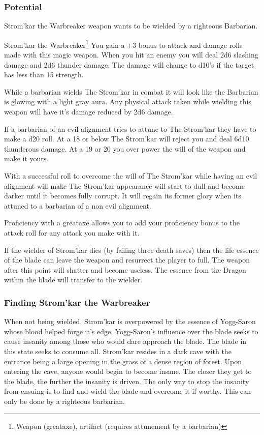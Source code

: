 \subsubsection{Potential}

Strom'kar the Warbreaker weapon wants to be wielded by a righteous Barbarian. 

\begin{commentbox}{Strom'kar the Warbreaker\footnote{Weapon (greataxe), artifact (requires attunement by a barbarian)}}	
	You gain a +3 bonus to attack and damage rolls made with this magic weapon. When you hit an enemy you will deal 2d6 slashing damage and 2d6 thunder damage. The damage will change to d10's if the target has less than 15 strength.
	
	While a barbarian wields The Strom'kar in combat it will look like the Barbarian is glowing with a light gray aura. Any physical attack taken while wielding this weapon will have it's damage reduced by 2d6 damage.
	
	If a barbarian of an evil alignment tries to attune to The Strom'kar they have to make a d20 roll. At a 18 or below The Strom'kar will reject you and deal 6d10 thunderous damage. At a 19 or 20 you over power the will of the weapon and make it yours.
	
	With a successful roll to overcome the will of The Strom'kar while having an evil alignment will make The Strom'kar appearance will start to dull and become darker until it becomes fully corrupt. It will regain its former glory when its attuned to a barbarian of a non evil alignment.
	
	Proficiency with a greataxe allows you to add your proficiency bonus to the attack roll for any attack you make with it.
	
	If the wielder of Strom'kar dies (by failing three death saves) then the life essence of the blade can leave the weapon and resurrect the player to full. The weapon after this point will shatter and become useless. The essence from the Dragon within the blade will transfer to the wielder.
\end{commentbox}

\subsubsection{Finding Strom'kar the Warbreaker}

When not being wielded, Strom'kar is overpowered by the essence of Yogg-Saron whose blood helped forge it's edge. Yogg-Saron's influence over the blade seeks to cause insanity among those who would dare approach the blade. The blade in this state seeks to consume all. Strom'kar resides in a dark cave with the entrance being a large opening in the grass of a dense region of forest. Upon entering the cave, anyone would begin to become insane. The closer they get to the blade, the further the insanity is driven. The only way to stop the insanity from ensuing is to find and wield the blade and overcome it if worthy. This can only be done by a righteous barbarian. 

